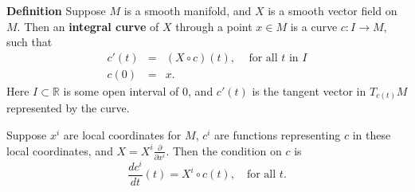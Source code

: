 \documentclass[12pt]{article}
\newcommand{\sR}[0]{\mathbb{R}}
\begin{document}
{\bf Definition} 
Suppose $M$ is a smooth manifold, and $X$ is a 
smooth vector field on $M$. Then an {\bf integral curve} of $X$ through 
a point $x\in M$ is a curve $c\colon I\to M$, such that 
\begin{eqnarray*}
 c'(t) &=& (X\circ c)(t), \,\,\,\,\,\,\,\mbox{for all $t$ in $I$}\\
 c(0) &=& x.
\end{eqnarray*}
Here $I\subset \sR$ is some open  interval of $0$, and $c'(t)$ is
the tangent vector in $T_{c(t)}M$ represented by the curve.

Suppose $x^i$ are local coordinates for $M$, $c^i$ are functions
representing $c$ in these local coordinates, and 
   $X=X^i \frac{\partial}{\partial x^i}$. Then the condition on $c$
is 
$$
   \frac{dc^i}{dt}(t) = X^i\circ c(t), \quad \mbox{for all $t$}.
$$
\end{document}
